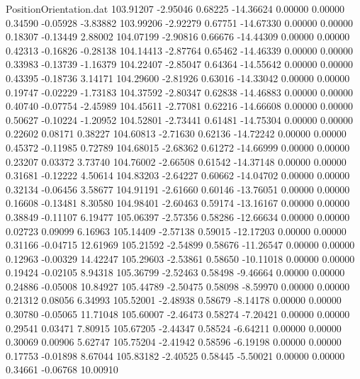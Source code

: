 \begin{filecontents}{PositionOrientation.dat}
 103.91207   -2.95046    0.68225   -14.36624    0.00000    0.00000    0.34590   -0.05928   -3.83882
 103.99206   -2.92279    0.67751   -14.67330    0.00000    0.00000    0.18307   -0.13449    2.88002
 104.07199   -2.90816    0.66676   -14.44309    0.00000    0.00000    0.42313   -0.16826   -0.28138
 104.14413   -2.87764    0.65462   -14.46339    0.00000    0.00000    0.33983   -0.13739   -1.16379
 104.22407   -2.85047    0.64364   -14.55642    0.00000    0.00000    0.43395   -0.18736    3.14171
 104.29600   -2.81926    0.63016   -14.33042    0.00000    0.00000    0.19747   -0.02229   -1.73183
 104.37592   -2.80347    0.62838   -14.46883    0.00000    0.00000    0.40740   -0.07754   -2.45989
 104.45611   -2.77081    0.62216   -14.66608    0.00000    0.00000    0.50627   -0.10224   -1.20952
 104.52801   -2.73441    0.61481   -14.75304    0.00000    0.00000    0.22602    0.08171    0.38227
 104.60813   -2.71630    0.62136   -14.72242    0.00000    0.00000    0.45372   -0.11985    0.72789
 104.68015   -2.68362    0.61272   -14.66999    0.00000    0.00000    0.23207    0.03372    3.73740
 104.76002   -2.66508    0.61542   -14.37148    0.00000    0.00000    0.31681   -0.12222    4.50614
 104.83203   -2.64227    0.60662   -14.04702    0.00000    0.00000    0.32134   -0.06456    3.58677
 104.91191   -2.61660    0.60146   -13.76051    0.00000    0.00000    0.16608   -0.13481    8.30580
 104.98401   -2.60463    0.59174   -13.16167    0.00000    0.00000    0.38849   -0.11107    6.19477
 105.06397   -2.57356    0.58286   -12.66634    0.00000    0.00000    0.02723    0.09099    6.16963
 105.14409   -2.57138    0.59015   -12.17203    0.00000    0.00000    0.31166   -0.04715   12.61969
 105.21592   -2.54899    0.58676   -11.26547    0.00000    0.00000    0.12963   -0.00329   14.42247
 105.29603   -2.53861    0.58650   -10.11018    0.00000    0.00000    0.19424   -0.02105    8.94318
 105.36799   -2.52463    0.58498    -9.46664    0.00000    0.00000    0.24886   -0.05008   10.84927
 105.44789   -2.50475    0.58098    -8.59970    0.00000    0.00000    0.21312    0.08056    6.34993
 105.52001   -2.48938    0.58679    -8.14178    0.00000    0.00000    0.30780   -0.05065   11.71048
 105.60007   -2.46473    0.58274    -7.20421    0.00000    0.00000    0.29541    0.03471    7.80915
 105.67205   -2.44347    0.58524    -6.64211    0.00000    0.00000    0.30069    0.00906    5.62747
 105.75204   -2.41942    0.58596    -6.19198    0.00000    0.00000    0.17753   -0.01898    8.67044
 105.83182   -2.40525    0.58445    -5.50021    0.00000    0.00000    0.34661   -0.06768   10.00910

\end{filecontents}
